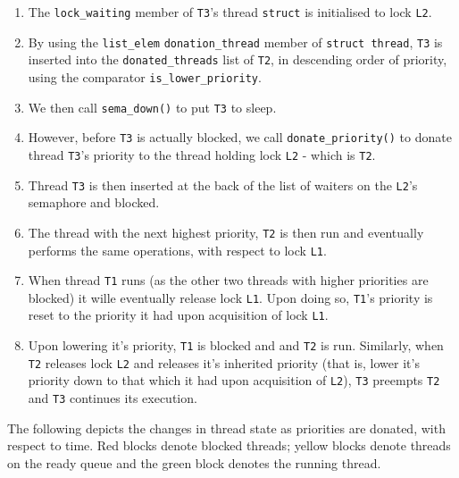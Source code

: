 \documentclass{article}
\begin{document}
\begin{enumerate}
\item The \texttt{lock\_waiting} member of \texttt{T3}'s thread \texttt{struct} is initialised to lock \texttt{L2}.
\item By using the \texttt{list\_elem} \texttt{donation\_thread} member of \texttt{struct thread}, \texttt{T3} is inserted into the \texttt{donated\_threads} list of \texttt{T2}, in descending order of priority, using the comparator \texttt{is\_lower\_priority}.
\item We then call \texttt{sema\_down()} to put \texttt{T3} to sleep.
\item However, before \texttt{T3} is actually blocked, we call \texttt{donate\_priority()} to donate thread \texttt{T3}'s priority to the thread holding lock \texttt{L2} - which is \texttt{T2}.
\item Thread \texttt{T3} is then inserted at the back of the list of waiters on the \texttt{L2}'s semaphore and blocked.
\item The thread with the next highest priority, \texttt{T2} is then run and eventually performs the same operations, with respect to lock \texttt{L1}.
\item When thread \texttt{T1} runs (as the other two threads with higher priorities are blocked) it wille eventually release lock \texttt{L1}. Upon doing so, \texttt{T1}'s priority is reset to the priority it had upon acquisition of lock \texttt{L1}.
\item Upon lowering it's priority, \texttt{T1} is blocked and and \texttt{T2} is run. Similarly, when \texttt{T2} releases lock \texttt{L2} and releases it's inherited priority (that is, lower it's priority down to that which it had upon acquisition of \texttt{L2}), \texttt{T3} preempts \texttt{T2} and \texttt{T3} continues its execution.
\end{enumerate}

\newpage
The following depicts the changes in thread state as priorities are donated, with respect to time. Red blocks denote blocked threads; yellow blocks denote threads on the ready queue and the green block denotes the running thread.
\\\\
\end{document}
